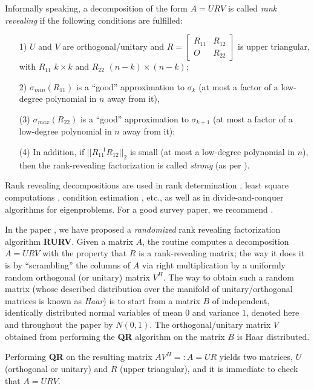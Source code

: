 \documentclass{article}
\theoremstyle{definition}
\begin{document}
Informally speaking, a decomposition of the form $A = URV$ is called \emph{rank revealing} if the following conditions are fulfilled:
\begin{itemize}
\item[1)] $U$ and $V$ are orthogonal/unitary and $R = \left [ \begin{array}{cc} R_{11} & R_{12} \\ O & R_{22} \end{array} \right ]$ is upper triangular, with $R_{11}$  $k \times k$ and  $R_{22}$  $(n-k) \times (n-k)$;
\item[2)] $\sigma_{min}(R_{11})$ is a ``good'' approximation to $\sigma_k$ (at most a factor of a low-degree polynomial in $n$ away from it),
\item[(3)] $\sigma_{max}(R_{22})$ is a ``good'' approximation to $\sigma_{k+1}$ (at most a factor of a low-degree polynomial in $n$ away from it);
\item[(4)] In addition, if $||R_{11}^{-1}R_{12}||_2$ is small (at most a low-degree polynomial in $n$), then the rank-revealing factorization is called  \emph{strong} (as per \cite{GE96}).

\end{itemize}

Rank revealing decompositions are used in rank determination \cite{stewart84}, least square computations \cite{CH92}, 
condition estimation \cite{bischof90a}, etc.,
as well as in divide-and-conquer algorithms for eigenproblems.
For a good survey paper, we recommend \cite{GE96}.

In the paper \cite{DDH07}, we have proposed a \emph{randomized} rank revealing factorization algorithm \textbf{RURV}. Given a matrix $A$, the routine computes a decomposition $A = URV$ with the property that $R$ is a rank-revealing matrix; the way it does it is by ``scrambling'' the columns of $A$ via right multiplication by a uniformly random orthogonal (or unitary) matrix $V^{H}$. The way to obtain such a random matrix (whose described distribution over the manifold of unitary/orthogonal matrices is known as \emph{Haar}) is to start from a matrix $B$ of independent, identically distributed normal variables of mean $0$ and variance $1$, denoted here and throughout the paper by $N(0,1)$. The orthogonal/unitary matrix $V$ obtained from performing the \textbf{QR} algorithm on the matrix $B$ is Haar distributed. 

Performing \textbf{QR} on the resulting matrix $A V^{H}=:\hat{A} = UR$ yields two matrices, $U$ (orthogonal or unitary) and $R$ (upper triangular), and it is immediate to check that $A = URV$. 
\end{document}
